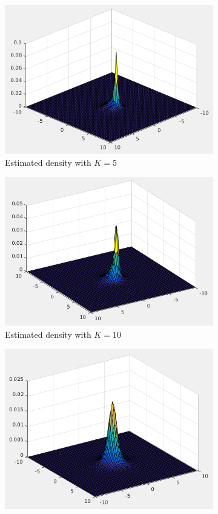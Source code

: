 \documentclass[12pt]{article}
\begin{document}
\begin{itemize}
\begin{figure}
\begin{subfigure}{0.45\textwidth}
\includegraphics[scale=0.35]{Imgs/5-19.png}
\caption{Estimated density with $K = 5$}
\end{subfigure}
\begin{subfigure}{0.45\textwidth}
\centering
\includegraphics[scale=0.35]{Imgs/5-20.png}
\caption{Estimated density with $K = 10$}
\end{subfigure}
\begin{subfigure}{0.45\textwidth}
\centering
\includegraphics[scale=0.35]{Imgs/5-21.png}

\end{subfigure}
\end{figure}
\end{itemize}
\end{document}
